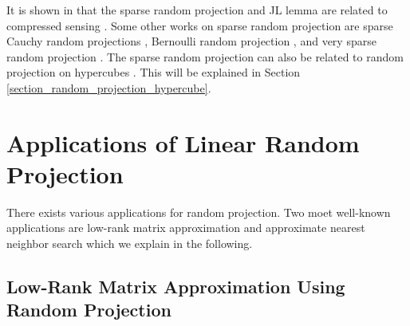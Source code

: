 \documentclass{article}
\begin{document}
It is shown in \cite{baraniuk2006johnson} that the sparse random projection and JL lemma are related to compressed sensing \cite{donoho2006compressed}.
Some other works on sparse random projection are sparse Cauchy random projections \cite{li2007nonlinear,ramirez2012reconstruction}, Bernoulli random projection \cite{achlioptas2003database}, and very sparse random projection \cite{li2006very}. 
The sparse random projection can also be related to random projection on hypercubes {\citep[Chapter 7.2]{vempala2005random}}. This will be explained in Section \ref{section_random_projection_hypercube}. 

\section{Applications of Linear Random Projection}\label{section_applications_of_random_projection}

There exists various applications for random projection. Two moet well-known applications are low-rank matrix approximation and approximate nearest neighbor search which we explain in the following. 

\subsection{Low-Rank Matrix Approximation Using Random Projection}

\end{document}

